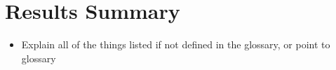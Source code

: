 
\section{Results Summary}

\begin{itemize}
	\item Explain all of the things listed if not defined in the glossary, or point to glossary
\end{itemize}